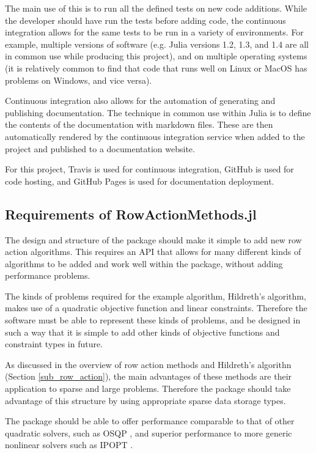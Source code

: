 The main use of this is to run all the defined tests on new code additions. While the developer should have run the tests before adding code, the continuous integration allows for the same tests to be run in a variety of environments. For example, multiple versions of software (e.g. Julia versions 1.2, 1.3, and 1.4 are all in common use while producing this project), and on multiple operating systems (it is relatively common to find that code that runs well on Linux or MacOS has problems on Windows, and vice versa). 

Continuous integration also allows for the automation of generating and publishing documentation. The technique in common use within Julia is to define the contents of the documentation with markdown files. These are then automatically rendered by the continuous integration service when added to the project and published to a documentation website.

For this project, Travis \cite{Travis} is used for continuous integration, GitHub \cite{GitHub} is used for code hosting, and GitHub Pages \cite{GitHubPages} is used for documentation deployment. 

\subsection{Requirements of RowActionMethods.jl}\label{sub:ram_req}

The design and structure of the package should make it simple to add new row action algorithms. This requires an \ac{API} that allows for many different kinds of algorithms to be added and work well within the package, without adding performance problems.

The kinds of problems required for the example algorithm, Hildreth's algorithm, makes use of a quadratic objective function and linear constraints. Therefore the software must be able to represent these kinds of problems, and be designed in such a way that it is simple to add other kinds of objective functions and constraint types in future.

As discussed in the overview of row action methods and Hildreth's algorithn (Section \ref{sub_row_action}), the main advantages of these methods are their application to sparse and large problems. Therefore the package should take advantage of this structure by using appropriate sparse data storage types. 

The package should be able to offer performance comparable to that of other quadratic solvers, such as OSQP \cite{Stellato2017OSQP:Programs}, and superior performance to more generic nonlinear solvers such as IPOPT \cite{Wachter2006OnProgramming}.


